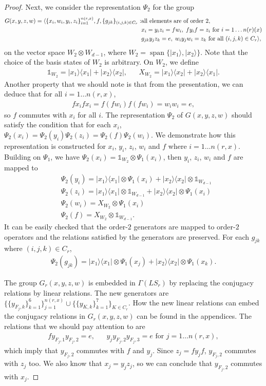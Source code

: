 \documentclass[11pt,letterpaper]{article}
\newcommand{\ket}[1]{|#1\rangle}
\newcommand{\ketbra}[2]{|#1\rangle\langle#2|}
\newcommand{\x}{\otimes}
\DeclarePairedDelimiter{\ip}{\langle}{\rangle}
\DeclareMathOperator{\spn}{span}
\newcommand{\1}{\mathbb{1}}
\newcommand{\LS}{LS}
\newcommand{\nr}{n(r)}
\theoremstyle{definition}
\begin{document}
\begin{proof}
Next, we consider the representation $\Psi_2$ for the group 
\begin{align*}
	G(x,y,z,w) = \ip{ \{x_i, w_i, y_i, z_i\}_{i=1}^{n(r,x)}, f, \{g_{jk}\}_{(i,j,k) \in C_r} :&\text{all elements are of order $2$},\\
	&x_i = y_iz_i = fw_i,\; fy_if =z_i \text{ for } i= 1 \dots \nr(x) \\
	&g_{jk}y_j z_k = e,\; w_iy_jw_i = z_k \text{ for all } (i,j,k)\in C_r},
\end{align*}
on the vector space $W_2 \x W_{d-1}$,
where $W_2 = \spn\{ \ket{x_1}, \ket{x_2}\}$.
Note that the choice of the basis states of $W_2$ is arbitrary.
On $W_2$, we define 
\begin{align}
	\1_{W_2} = \ketbra{x_1}{x_1} + \ketbra{x_2}{x_2}, && X_{W_2} = \ketbra{x_1}{x_2} + \ketbra{x_2}{x_1}.
\end{align}
Another property that we should note is that from the presentation, we can deduce that for all $i = 1 \dots n(r,x)$, 
\begin{align}
	fx_i fx_i = f (fw_i) f (fw_i) = w_i w_i = e,
\end{align}
so $f$ commutes with $x_i$ for all $i$.
The representation $\Psi_2$ of $G(x,y,z,w)$ should satisfy the condition that for each $x_i$, 
$\Psi_2(x_i) = \Psi_2(y_i)\Psi_2(z_i) = \Psi_2(f)\Psi_2(w_i)$. We demonstrate how this representation is constructed 
for $x_i$, $y_i$, $z_i$, $w_i$ and $f$ where $i = 1 \dots n(r,x)$.
Building on $\Psi_1$, we have $\Psi_2(x_i) = \1_{W_2} \x \Psi_1(x_i)$, then
$y_i$, $z_i$, $w_i$ and $f$ are mapped to
\begin{align*}
&\Psi_2(y_i) = \ketbra{x_1}{x_1} \x \Psi_1(x_i) + \ketbra{x_2}{x_2} \x \1_{W_{d-1}} \\
&\Psi_2(z_i) =\ketbra{x_1}{x_1} \x \1_{W_{d-1}} + \ketbra{x_2}{x_2} \x \Psi_1(x_i) \\
&\Psi_2(w_i) =  X_{W_2} \x \Psi_1(x_i)\\
&\Psi_2(f) = X_{W_2} \x \1_{W_{d-1}}.
\end{align*}
It can be easily checked that the order-$2$ generators are mapped to order-$2$ operators and
the relations satisfied by the generators are preserved.
For each $g_{jk}$ where $(i,j,k) \in C_r$, 
\begin{align}
\Psi_2(g_{jk}) = \ketbra{x_1}{x_1} \x \Psi_1(x_j) + \ketbra{x_2}{x_2} \x \Psi_1(x_k).
\end{align}

The group $G_r(x,y,z,w)$ is embedded in $\Gamma(\LS_r)$ by replacing the conjugacy relations 
by linear relations. The new generators are $\{\{y_{F_j,k}\}_{k=1}^6\}_{j=1}^{n(r,x)}
\cup \{\{y_{K,k}\}_{k=1}^7\}_{K \in C_r}$. How the new linear relations can embed the conjugacy relations 
in $G_r(x,y,z,w)$ can be found in the appendices. 
The relations that we should pay attention to are
\begin{align}
	fy_{F_j,1}y_{F_j,2} =  e, && y_j y_{F_j,2}y_{F_j,3} = e \text{ for } j = 1 \dots n(r,x),
\end{align}
which imply that $y_{F_j, 2}$ commutes with $f$ and $y_j$.
Since $z_j = fy_jf$, $y_{F_j, 2}$ commutes with $z_j$ too.
We also know that $x_j = y_jz_j$, so we can conclude that $y_{F_j, 2}$ commutes with $x_j$.



\end{proof}
\end{document}
